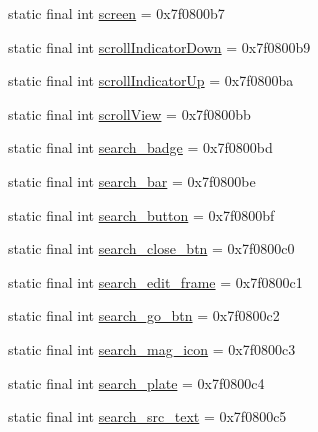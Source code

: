 \begin{DoxyCompactItemize}
\item 
static final int \mbox{\hyperlink{classandroid_1_1support_1_1v7_1_1appcompat_1_1R_1_1id_a999bf5411538fa6caab27efaeddea15e}{screen}} = 0x7f0800b7
\item 
static final int \mbox{\hyperlink{classandroid_1_1support_1_1v7_1_1appcompat_1_1R_1_1id_a7e3bdeb1ba7e1d2a81995fb3225f0b86}{scroll\+Indicator\+Down}} = 0x7f0800b9
\item 
static final int \mbox{\hyperlink{classandroid_1_1support_1_1v7_1_1appcompat_1_1R_1_1id_a331a78b0369cf9e185e49132315336cd}{scroll\+Indicator\+Up}} = 0x7f0800ba
\item 
static final int \mbox{\hyperlink{classandroid_1_1support_1_1v7_1_1appcompat_1_1R_1_1id_a2c75911e3d2885b50876721cd34f2cc6}{scroll\+View}} = 0x7f0800bb
\item 
static final int \mbox{\hyperlink{classandroid_1_1support_1_1v7_1_1appcompat_1_1R_1_1id_a2ee860df597b218b135c65ac1241c346}{search\+\_\+badge}} = 0x7f0800bd
\item 
static final int \mbox{\hyperlink{classandroid_1_1support_1_1v7_1_1appcompat_1_1R_1_1id_a37282400460588b9933a8f3b8c74d577}{search\+\_\+bar}} = 0x7f0800be
\item 
static final int \mbox{\hyperlink{classandroid_1_1support_1_1v7_1_1appcompat_1_1R_1_1id_a9a458b08585f3fe2c509d27967fbfa5a}{search\+\_\+button}} = 0x7f0800bf
\item 
static final int \mbox{\hyperlink{classandroid_1_1support_1_1v7_1_1appcompat_1_1R_1_1id_a6af82c5fe032136546b41b96b191c185}{search\+\_\+close\+\_\+btn}} = 0x7f0800c0
\item 
static final int \mbox{\hyperlink{classandroid_1_1support_1_1v7_1_1appcompat_1_1R_1_1id_a8b2c997939e7855cb1513ebc8deb69c5}{search\+\_\+edit\+\_\+frame}} = 0x7f0800c1
\item 
static final int \mbox{\hyperlink{classandroid_1_1support_1_1v7_1_1appcompat_1_1R_1_1id_a55313edde7c5ac6053e414c67e43c4db}{search\+\_\+go\+\_\+btn}} = 0x7f0800c2
\item 
static final int \mbox{\hyperlink{classandroid_1_1support_1_1v7_1_1appcompat_1_1R_1_1id_aad15bb656dd8d095094b7085bf2fecee}{search\+\_\+mag\+\_\+icon}} = 0x7f0800c3
\item 
static final int \mbox{\hyperlink{classandroid_1_1support_1_1v7_1_1appcompat_1_1R_1_1id_ae9cb3debcecb3c277a635dc221a0025e}{search\+\_\+plate}} = 0x7f0800c4
\item 
static final int \mbox{\hyperlink{classandroid_1_1support_1_1v7_1_1appcompat_1_1R_1_1id_a2766f5877537681409847f9e8460ffeb}{search\+\_\+src\+\_\+text}} = 0x7f0800c5

\end{DoxyCompactItemize}
